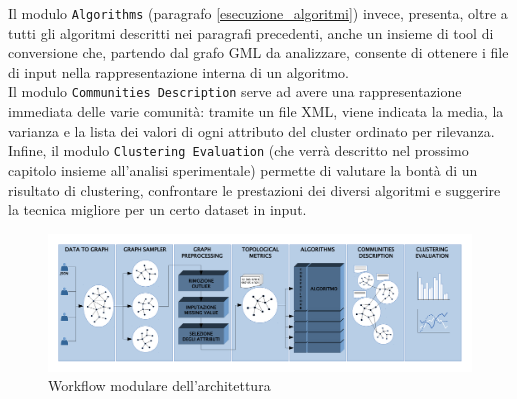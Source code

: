 Il modulo \texttt{Algorithms} (paragrafo \ref{esecuzione_algoritmi}) invece, presenta, oltre a tutti gli algoritmi descritti nei paragrafi precedenti, anche un insieme di tool di conversione che, partendo dal grafo GML da analizzare, consente di ottenere i file di input nella rappresentazione interna di un algoritmo.\\
Il modulo \texttt{Communities Description} serve ad avere una rappresentazione immediata delle varie comunit\`a: tramite un file XML, viene indicata la media, la varianza e la lista dei valori di ogni attributo del cluster ordinato per rilevanza.\\
Infine, il modulo \texttt{Clustering Evaluation} (che verr\`a descritto nel prossimo capitolo insieme all'analisi sperimentale) permette di valutare la bont\`a di un risultato di clustering, confrontare le prestazioni dei diversi algoritmi e suggerire la tecnica migliore per un certo dataset in input.
\newpage
\begin{figure}
	\centering
    \includegraphics[width=1\textheight]{pictures/workflow.pdf}
    \caption{Workflow modulare dell'architettura}
    \label{fig:framework_flow}
\end{figure}